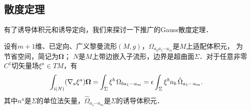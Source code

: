 
\subsection{散度定理}
有了诱导体积元和诱导定向，我们来探讨一下推广的Gauss散度定理．

\begin{theorem}\label{chsm:thm_Gauss-Divergence}
设有$m+1$维、已定向、广义黎曼流形$(M,g)$，${\Omega}_{a_0 a_1 \cdots a_{m}}$是$M$上适配体积元，
为节省空间，简记为${\boldsymbol{\Omega} }$；
$N$是$M$上带边嵌入子流形，边界是超曲面$\Sigma$．对于任意非零$C^1$切矢量场$\xi^a\in TM$，有
\begin{equation}\label{chsm:eqn_Gauss-Divergence}
    \int_{{\rm i}(N)} (\nabla_a \xi^a) \boldsymbol{\Omega}
    =\int_{\Sigma} \xi^b \, \Omega_{b a_1 \cdots a_{m} }
    =\epsilon \int_{\Sigma} \xi^b n_b \, \hat{\Omega}_{a_1 \cdots a_{m} } .
\end{equation}
其中$n^a$是$\Sigma$的单位法矢量，$\hat{\Omega}_{a_1 \cdots a_{m} }$是$\Sigma$的诱导体积元．
\end{theorem}
